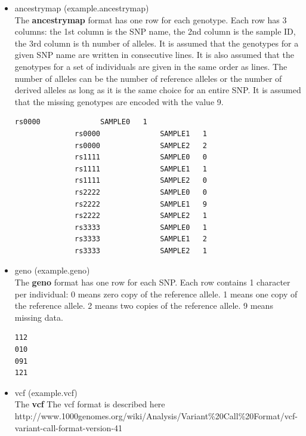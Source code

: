 \documentclass[10pt,a4paper]{article}
\begin{document}
\begin{itemize}
\item ancestrymap (example.ancestrymap)\\
The {\bf ancestrymap} format has one row for each genotype. Each row has 3 columns: the 1st column is the SNP name, the 2nd column is the sample ID, the 3rd column is th number of alleles. It is assumed that the genotypes for a given SNP name are written in consecutive lines. It is also assumed that the genotypes for a set of individuals are given in the same order as lines. The number of alleles can be the number of reference alleles or the number of derived alleles as long as it is the same choice for an entire SNP. It is assumed that the missing genotypes are encoded with the value 9.
\begin{center}
\footnotesize
\begin{Verbatim}[frame=single]
              rs0000              SAMPLE0   1
              rs0000              SAMPLE1   1
              rs0000              SAMPLE2   2
              rs1111              SAMPLE0   0
              rs1111              SAMPLE1   1
              rs1111              SAMPLE2   0
              rs2222              SAMPLE0   0
              rs2222              SAMPLE1   9
              rs2222              SAMPLE2   1
              rs3333              SAMPLE0   1
              rs3333              SAMPLE1   2
              rs3333              SAMPLE2   1
\end{Verbatim}
\end{center}

\item geno (example.geno)\\
The {\bf geno} format has one row for each SNP.
Each row contains 1 character per individual:
        0 means zero copy of the reference allele.
        1 means one copy of the reference allele.
        2 means two copies of the reference allele.
        9 means missing data.

\begin{center}
\footnotesize
\begin{Verbatim}[frame=single]
112
010
091
121
\end{Verbatim}
\end{center}

\item vcf (example.vcf)\\
The {\bf vcf} The vcf format is described here\\
http://www.1000genomes.org/wiki/Analysis/Variant\%20Call\%20Format/vcf-variant-call-format-version-41


\end{itemize}
\end{document}
